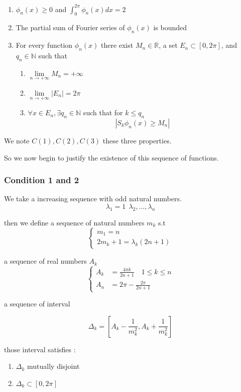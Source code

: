 \documentclass{article}
\begin{document}
\begin{enumerate}
    \item\label{C1}$ \phi_n(x)\geqslant 0 $ and $ \int_{0}^{2\pi}\phi_n(x)dx=2 $
    \item The partial sum of Fourier series of $ \phi_n(x) $ is bounded
    \item\label{C3} For every function $ \phi_n(x) $ there exist $ M_n  \in \mathbb{R}  $, a set $ E_n \subset [0,2\pi] $, and $ q_n \in \mathbb{N}  $ such that 
        \begin{enumerate}
            \item $ \lim\limits_{n\rightarrow +\infty}M_n = +\infty$
            \item $ \lim\limits_{n\rightarrow +\infty}\left\lvert E_n \right\rvert = 2 \pi $
            \item $ \forall x \in E_n, \exists q_n \in \mathbb{N}  $ such that for $ k \leqslant q_n $
            \[ \left\lvert S_k\phi_n(x)\geqslant M_n \right\rvert \]
        \end{enumerate}
\end{enumerate}
We note $ C(1),C(2),C(3)$ these three properties. \par
So we now begin to justify the existence of this sequence of functions.
\subsubsection*{Condition 1 and 2}


We take a increasing sequence with odd natural numbers.
\[ \lambda_1=1 \ \  \lambda_2,\dots,\lambda_n \] 

then we define a sequence of natural numbers $ m_k $ s.t
\[
    \begin{cases}
    m_1=n   \\
    2m_k+1 =\lambda_k(2n+1) 
\end{cases} 
\]

a sequence of real numbers $ A_k $
\[
\begin{cases}
    A_k &=\frac{4\pi k}{2n+1}\quad 1 \leqslant k \leqslant n \\
    A_n&= 2\pi- \frac{2\pi}{2n+1}
\end{cases}
\]

a sequence of interval 

\[ \Delta_k=[A_k-\frac{1}{m_k^2},A_k+\frac{1}{m^2_k}] \]

those interval satisfies :

\begin{enumerate}
    \item $ \Delta_k$ mutually disjoint
    \item $ \Delta_k \subset [0,2\pi] $
\end{enumerate}
\end{document}
